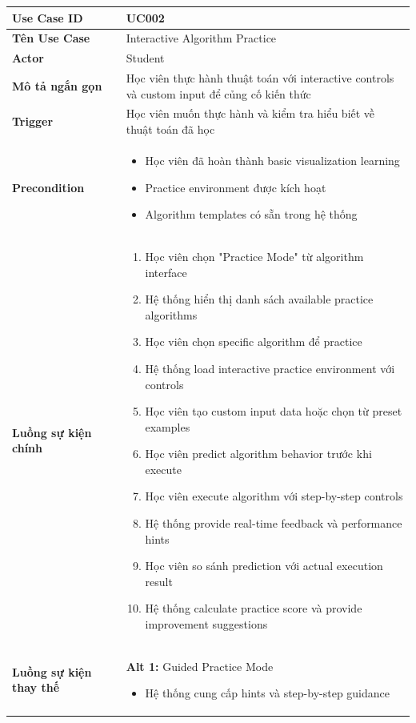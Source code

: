 \begin{longtable}{| p{3cm} | p{10cm} |}
\hline
\textbf{Use Case ID} & UC002 \\ \hline
\textbf{Tên Use Case} & Interactive Algorithm Practice \\ \hline
\textbf{Actor} & Student \\ \hline
\textbf{Mô tả ngắn gọn} & Học viên thực hành thuật toán với interactive controls và custom input để củng cố kiến thức \\ \hline
\textbf{Trigger} & Học viên muốn thực hành và kiểm tra hiểu biết về thuật toán đã học \\ \hline
\textbf{Precondition} & 
\begin{itemize}
    \item Học viên đã hoàn thành basic visualization learning
    \item Practice environment được kích hoạt
    \item Algorithm templates có sẵn trong hệ thống
\end{itemize} \\ \hline
\textbf{Luồng sự kiện chính} & 
\begin{enumerate}
    \item Học viên chọn "Practice Mode" từ algorithm interface
    \item Hệ thống hiển thị danh sách available practice algorithms
    \item Học viên chọn specific algorithm để practice
    \item Hệ thống load interactive practice environment với controls
    \item Học viên tạo custom input data hoặc chọn từ preset examples
    \item Học viên predict algorithm behavior trước khi execute
    \item Học viên execute algorithm với step-by-step controls
    \item Hệ thống provide real-time feedback và performance hints
    \item Học viên so sánh prediction với actual execution result
    \item Hệ thống calculate practice score và provide improvement suggestions
\end{enumerate} \\ \hline
\textbf{Luồng sự kiện thay thế} & 
\textbf{Alt 1:} Guided Practice Mode
\begin{itemize}
    \item Hệ thống cung cấp hints và step-by-step guidance

\end{itemize}
\end{longtable}
